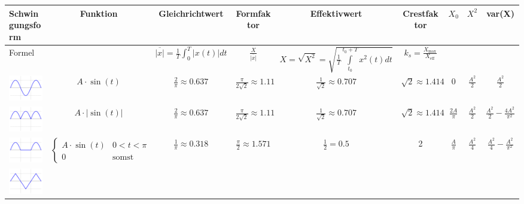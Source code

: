 \begin{table}
\begin{tabular}{|l|c|c|c|c|c|c|c|c|}
\hline
	Schwingungsform & Funktion & Gleichrichtwert & Formfaktor &
	Effektivwert & Crestfaktor & \textbf{$X_0$} & \textbf{$X^2$} & \textbf{var(X)} \\
\hline
	Formel &
	&
	$\overline{\left|x\right|} = \frac1T\int_{0}^{T}\left| x(t)\right|dt$&
	$\frac{X}{\overline{\left|x\right|}}$&
	$X = \sqrt{X^2} = \sqrt{\frac{1}{T} \int\limits ^{t_0+T}_{t_0}{x^2(t)dt}}$&
	$k_{s}=\frac{X_{\mathrm{max}}}{X_{\mathrm{eff}}}$&
	&
	&
	\\
\hline
	\includegraphics[width=2cm]{idiotenseite/images/table_sine_wave.png} &
	$A\cdot\sin(t)$ &
	$\frac{2}{\pi} \approx 0.637$ &
	$\frac{\pi}{2\sqrt{2}} \approx 1.11$ &
	$\frac{1}{\sqrt{2}}\approx 0.707$ &
	$\sqrt{2}\approx 1.414$ &
	$0$ &
	$\frac{A^2}{2}$ &
	$\frac{A^2}{2}$ \\
\hline	
	\includegraphics[width=2cm]{idiotenseite/images/table_full-wave_rectified_sine.png} &
	$A\cdot|\sin(t)|$ &
	$\frac{2}{\pi} \approx 0.637$ &
	$\frac{\pi}{2\sqrt{2}} \approx 1.11$ &
	$\frac{1}{\sqrt{2}} \approx 0.707$ &
	$\sqrt{2} \approx 1.414$  &
	$\frac{2A}{\pi}$ & $\frac{A^2}{2}$ & $\frac{A^2}{2}-\frac{4A^2}{\pi^2}$
	\\
\hline
	\includegraphics[width=2cm]{idiotenseite/images/table_half-wave_rectified_sine.png} &
	$\begin{cases} A\cdot\sin (t) & 0<t<\pi  \\ 0 & \textrm{somst}\end{cases}$ &
	$\frac{1}{\pi}\approx 0.318$ &
	$\frac{\pi}{2}\approx 1.571$ &
	$\frac{1}{2} = 0.5$	&
	2  &
	$\frac{A}{\pi}$ &
	$\frac{A^2}{4}$ & $\frac{A^2}{4}-\frac{A^2}{\pi^2}$
	\\
\hline
	\includegraphics[width=2cm]{idiotenseite/images/table_triangle_wave.png} &

\end{tabular}
\end{table}
